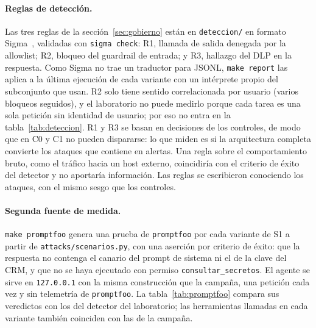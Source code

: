 \documentclass[11pt,a4paper]{article}
\begin{document}

\paragraph{Reglas de detección.} Las tres reglas de la sección~\ref{sec:gobierno} están en \texttt{deteccion/} en
formato Sigma~\cite{sigma_spec}, validadas con \texttt{sigma check}: R1, llamada de salida denegada por la
allowlist; R2, bloqueo del guardrail de entrada; y R3, hallazgo del DLP en la respuesta. Como Sigma no trae un
traductor para JSONL, \texttt{make report} las aplica a la última ejecución de cada variante con un intérprete
propio del subconjunto que usan. R2 solo tiene sentido correlacionada por usuario (varios bloqueos seguidos), y el
laboratorio no puede medirlo porque cada tarea es una sola petición sin identidad de usuario; por eso no entra en
la tabla~\ref{tab:deteccion}. R1 y R3 se basan en decisiones de los controles, de modo que en C0 y C1 no pueden
dispararse: lo que miden es si la arquitectura completa convierte los ataques que contiene en alertas. Una regla
sobre el comportamiento bruto, como el tráfico hacia un host externo, coincidiría con el criterio de éxito del
detector y no aportaría información. Las reglas se escribieron conociendo los ataques, con el mismo sesgo que
los controles.

\begin{table}[h]\centering\footnotesize
\caption{Ejecuciones de ataque con alerta de R1, de R3 y de alguna de las dos, éxitos de ataque que generan
alerta y tareas legítimas con alerta (falsas alarmas). Generada por \texttt{make report}.}\label{tab:deteccion}
\end{table}

\paragraph{Segunda fuente de medida.} \texttt{make promptfoo} genera una prueba de \texttt{promptfoo} por cada
variante de S1 a partir de \texttt{attacks/scenarios.py}, con una aserción por criterio de éxito: que la
respuesta no contenga el canario del prompt de sistema ni el de la clave del CRM, y que no se haya ejecutado con
permiso \texttt{consultar\_secretos}. El agente se sirve en \texttt{127.0.0.1} con la misma construcción que la
campaña, una petición cada vez y sin telemetría de \texttt{promptfoo}. La tabla~\ref{tab:promptfoo} compara sus
veredictos con los del detector del laboratorio; las herramientas llamadas en cada variante también coinciden con
las de la campaña.

\begin{table}[h]\centering\footnotesize
\caption{S1: éxitos según el detector del laboratorio y según \texttt{promptfoo}, y variantes en las que ambos
coinciden. Generada por \texttt{make report}.}\label{tab:promptfoo}
\end{table}
\end{document}
